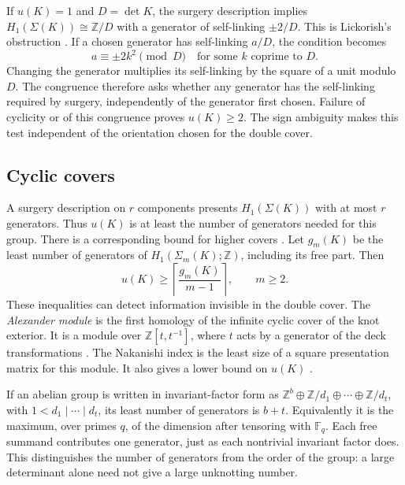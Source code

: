 \documentclass[12pt, oneside]{amsart}
\newcommand{\bbz}{{\mathbb Z}}
\newcommand{\dbc}{\Sigma}
\begin{document}
If $u(K)=1$ and $D=\det K$, the surgery description implies
$H_1(\dbc(K))\cong\bbz/D$ with a generator of self-linking $\pm2/D$. This is
Lickorish's obstruction \cite{Lickorish}. If a chosen generator has self-linking $a/D$,
the condition becomes
\begin{equation}\label{eq:lickorish}
    a\equiv\pm2k^2\pmod D\quad\text{for some }k\text{ coprime to }D.
\end{equation}
Changing the generator multiplies its self-linking by the square of a unit modulo $D$.
The congruence therefore asks whether any generator has the self-linking required by
surgery, independently of the generator first chosen.
Failure of cyclicity or of this congruence proves $u(K)\ge2$. The sign ambiguity makes
this test independent of the orientation chosen for the double cover.

\subsection{Cyclic covers}\label{sec:generator-background}

A surgery description on $r$ components presents $H_1(\dbc(K))$ with at most $r$
generators. Thus $u(K)$ is at least the number of generators needed for this group.
There is a corresponding bound for higher covers \cite{Wendt,Nakanishi81}. Let $g_m(K)$ be
the least number of generators of $H_1(\dbc_m(K);\bbz)$, including its free part. Then
\begin{equation}\label{eq:cyclic}
    u(K)\ge\left\lceil\frac{g_m(K)}{m-1}\right\rceil,\qquad m\ge2.
\end{equation}
These inequalities can detect information invisible in the double cover. The
\emph{Alexander module} is the first homology of the infinite cyclic cover of the knot
exterior. It is a module over $\bbz[t,t^{-1}]$, where $t$ acts by a generator of the
deck transformations \cite[\S1]{Nakanishi81}. The Nakanishi index is the least size of a
square presentation matrix for this module. It also gives a lower bound on $u(K)$
\cite[Thm.~3]{Nakanishi81}.

If an abelian group is written in invariant-factor form as
$\bbz^b\oplus\bbz/d_1\oplus\cdots\oplus\bbz/d_t$, with
$1<d_1\mid\cdots\mid d_t$, its least number of generators is $b+t$. Equivalently it is
the maximum, over primes $q$, of the dimension after tensoring with $\mathbb F_q$.
Each free summand contributes one generator, just as each nontrivial invariant factor does.
This distinguishes the number of generators from the order of the group: a large
determinant alone need not give a large unknotting number.
\end{document}
